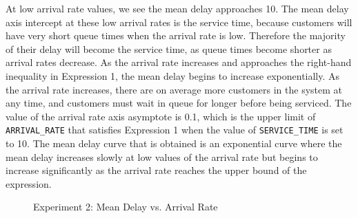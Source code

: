 At low arrival rate values, we see the mean delay approaches 10. The mean delay axis intercept at these low arrival rates is the service time, because customers will have very short queue times when the arrival rate is low. Therefore the majority of their delay will become the service time, as queue times become shorter as arrival rates decrease.
As the arrival rate increases and approaches the right-hand inequality in Expression 1, the mean delay begins to increase exponentially. As the arrival rate increases, there are on average more customers in the system at any time, and customers must wait in queue for longer before being serviced. The value of the arrival rate axis asymptote is 0.1, which is the upper limit of \texttt{ARRIVAL\_RATE} that satisfies Expression 1 when the value of \texttt{SERVICE\_TIME} is set to 10.
The mean delay curve that is obtained is an exponential curve where the mean delay increases slowly at low values of the arrival rate but begins to increase significantly as the arrival rate reaches the upper bound of the expression.

\begin{figure}[h]
\centering
{}
\caption{Experiment 2: Mean Delay vs. Arrival Rate}
\label{fig:exp2}
\end{figure}